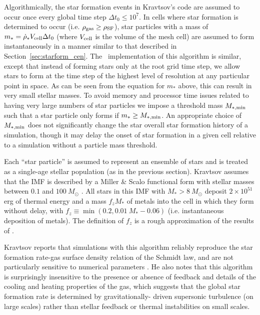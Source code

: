 Algorithmically, the star formation events in Kravtsov's code are
assumed to occur once every global time step $\Delta t_0 \leq 10^7$.
In cells where star formation is determined to occur (i.e. $\rho_{\rm
  gas} \geq \rho_{\rm SF}$), star particles with a mass of $m_* =
\dot{\rho}_* V_{\rm cell} \Delta t_0$ (where $V_{\rm cell}$ is the
volume of the mesh cell) are assumed to form instantaneously in a
manner similar to that described in Section~\ref{sec:starform_cen}.
The \enzo\ implementation of this algorithm is similar, except that
instead of forming stars only at the root grid time step, we allow
stars to form at the time step of the highest level of resolution at
any particular point in space.  As can be seen from the equation for
$m_*$ above, this can result in very small stellar masses.  To avoid
memory and processor time issues related to having very large numbers
of star particles we impose a threshold mass $M_{\rm *,min}$ such that
a star particle only forms if $m_* \geq M_{\rm *,min}$.  An
appropriate choice of $M_{\rm *,min}$ does not significantly change
the star overall star formation history of a simulation, though it may
delay the onset of star formation in a given cell relative to a
simulation without a particle mass threshold.

Each ``star particle'' is assumed to represent an ensemble of stars
and is treated as a single-age stellar population (as in the previous
section).  Kravtsov assumes that the IMF is described by a Miller \&
Scalo functional form with stellar masses between $0.1$ and
$100~M_\odot$ \citep{1979ApJS...41..513M}.  All stars in this IMF with
$M_* > 8~M_\odot$ deposit $2 \times 10^{51}$ erg of thermal energy
and a mass $f_z M_*$ of metals into the cell in which they form
without delay, with $f_z \equiv \min(0.2, 0.01~M_*-0.06)$
(i.e. instantaneous deposition of metals).  The definition of $f_z$ is
a rough approximation of the results of \citet{1995ApJS..101..181W}.

Kravtsov reports that simulations with this algorithm reliably
reproduce the star formation rate-gas surface density relation of the
Schmidt law, and are not particularly sensitive to numerical
parameters \citep{2003ApJ...590L...1K}.  He also notes that this
algorithm is surprisingly insensitive to the presence or absence of
feedback and details of the cooling and heating properties of the gas,
which suggests that the global star formation rate is determined by
gravitationally- driven supersonic turbulence (on large scales) rather
than stellar feedback or thermal instabilities on small scales.

